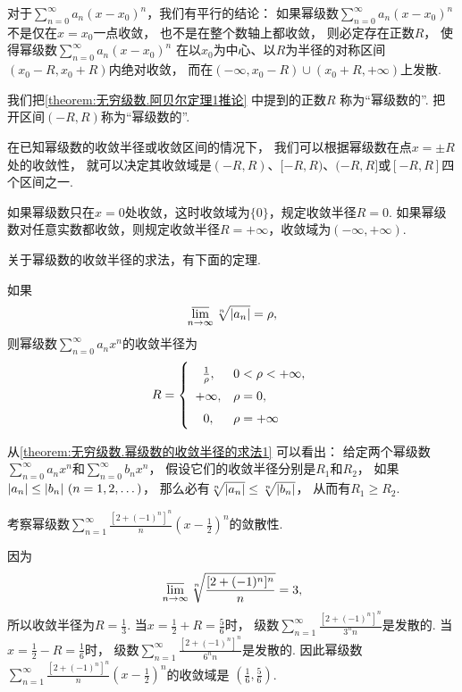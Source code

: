 对于\(\sum_{n=0}^\infty a_n (x-x_0)^n\)，我们有平行的结论：
如果幂级数\(\sum_{n=0}^\infty a_n (x-x_0)^n\)不是仅在\(x=x_0\)一点收敛，
也不是在整个数轴上都收敛，
则必定存在正数\(R\)，
使得幂级数\(\sum_{n=0}^\infty a_n (x-x_0)^n\)
在以\(x_0\)为中心、以\(R\)为半径的对称区间\((x_0-R,x_0+R)\)内绝对收敛，
而在\((-\infty,x_0-R)\cup(x_0+R,+\infty)\)上发散.

我们把\cref{theorem:无穷级数.阿贝尔定理1推论} 中提到的正数\(R\)
称为“幂级数的”.
把开区间\((-R,R)\)称为“幂级数的”.

在已知幂级数的收敛半径或收敛区间的情况下，
我们可以根据幂级数在点\(x = \pm R\)处的收敛性，
就可以决定其收敛域是\((-R,R)\)、\([-R,R)\)、\((-R,R]\)或\([-R,R]\)四个区间之一.

如果幂级数只在\(x=0\)处收敛，这时收敛域为\(\{0\}\)，规定收敛半径\(R=0\).
如果幂级数对任意实数都收敛，则规定收敛半径\(R=+\infty\)，收敛域为\((-\infty,+\infty)\).

关于幂级数的收敛半径的求法，有下面的定理.
\begin{theorem}\label{theorem:无穷级数.幂级数的收敛半径的求法1}
如果\[
	\varlimsup_{n\to\infty} \sqrt[n]{\abs{a_n}} = \rho,
\]
则幂级数\(\sum_{n=0}^\infty a_n x^n\)的收敛半径为\[
	R = \left\{ \def\arraystretch{1.5} \begin{array}{cl}
		\frac1\rho, & 0<\rho<+\infty, \\
		+\infty, & \rho = 0, \\
		0, & \rho = +\infty \\
	\end{array} \right.
\]
\end{theorem}
\begin{remark}
从\cref{theorem:无穷级数.幂级数的收敛半径的求法1} 可以看出：
给定两个幂级数\(\sum_{n=0}^\infty a_n x^n\)和\(\sum_{n=0}^\infty b_n x^n\)，
假设它们的收敛半径分别是\(R_1\)和\(R_2\)，
如果\(\abs{a_n} \leq \abs{b_n}\ (n=1,2,\dotsc)\)，
那么必有\(\sqrt[n]{\abs{a_n}} \leq \sqrt[n]{\abs{b_n}}\)，
从而有\(R_1 \geq R_2\).
\end{remark}

\begin{example}
考察幂级数\(\sum_{n=1}^\infty \frac{[2+(-1)^n]^n}{n} \left(x-\frac12\right)^n\)的敛散性.
\begin{solution}
因为\[
	\varlimsup_{n\to\infty} \sqrt[n]{\frac{[2+(-1)^n]^n}n} = 3,
\]
所以收敛半径为\(R=\frac13\).
当\(x=\frac12+R=\frac56\)时，
级数\(\sum_{n=1}^\infty \frac{[2+(-1)^n]^n}{3^n n}\)是发散的.
当\(x=\frac12-R=\frac16\)时，
级数\(\sum_{n=1}^\infty \frac{[2+(-1)^n]^n}{6^n n}\)是发散的.
因此幂级数\(\sum_{n=1}^\infty \frac{[2+(-1)^n]^n}{n} \left(x-\frac12\right)^n\)的收敛域是
\(\left(\frac16,\frac56\right)\).
\end{solution}
\end{example}

